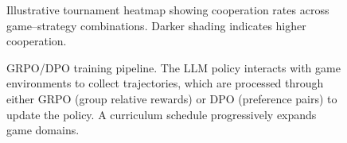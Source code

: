 \documentclass[11pt,a4paper]{article}
\begin{document}


\begin{figure}[t]
    \centering
    
    \caption{Illustrative tournament heatmap showing cooperation rates across
    game--strategy combinations. Darker shading indicates higher cooperation.}
    \label{fig:heatmap}
\end{figure}



\begin{figure}[t]
    \centering
    
    \caption{GRPO/DPO training pipeline. The LLM policy interacts with game
    environments to collect trajectories, which are processed through either
    GRPO (group relative rewards) or DPO (preference pairs) to update the
    policy. A curriculum schedule progressively expands game domains.}
    \label{fig:training-pipeline}
\end{figure}












\begin{appendices}





\end{appendices}
\end{document}
